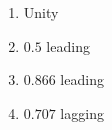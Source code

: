 \documentclass[journal,12pt,onecolumn]{IEEEtran}
\theoremstyle{remark}
\begin{document}
\begin{enumerate}
\begin{enumerate}
	\item Unity
	\item $0.5$ leading
	\item $0.866$ leading
	\item $0.707$ lagging
\end{enumerate}


\end{enumerate}
\end{document}
